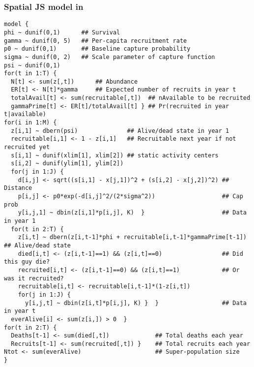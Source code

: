 \documentclass[color=usenames,dvipsnames]{beamer}\usepackage[]{graphicx}\usepackage[]{color}
\makeatletter
\newenvironment{kframe}{%
 \def\at@end@of@kframe{}%
 \ifinner\ifhmode%
  \def\at@end@of@kframe{\end{minipage}}%
  \begin{minipage}{\columnwidth}%
 \fi\fi%
 \def\FrameCommand##1{\hskip\@totalleftmargin \hskip-\fboxsep
 \colorbox{shadecolor}{##1}\hskip-\fboxsep
     \hskip-\linewidth \hskip-\@totalleftmargin \hskip\columnwidth}%
 \MakeFramed {\advance\hsize-\width
   \@totalleftmargin\z@ \linewidth\hsize
   \@setminipage}}%
 {\par\unskip\endMakeFramed%
 \at@end@of@kframe}
\newenvironment{knitrout}{}{} %
\makeatother
\begin{document}
\begin{frame}[fragile]
  \frametitle{Spatial JS model in \jags}
  \tiny
\begin{knitrout}\tiny
{}\color{fgcolor}\begin{kframe}
\begin{verbatim}
model {
phi ~ dunif(0,1)      ## Survival
gamma ~ dunif(0, 5)   ## Per-capita recruitment rate
p0 ~ dunif(0,1)       ## Baseline capture probability
sigma ~ dunif(0, 2)   ## Scale parameter of capture function
psi ~ dunif(0,1)    
for(t in 1:T) {
  N[t] <- sum(z[,t])      ## Abundance
  ER[t] <- N[t]*gamma     ## Expected number of recruits in year t
  totalAvail[t] <- sum(recruitable[,t])  ## nAvailable to be recruited
  gammaPrime[t] <- ER[t]/totalAvail[t] } ## Pr(recruited in year t|available)
for(i in 1:M) {
  z[i,1] ~ dbern(psi)              ## Alive/dead state in year 1
  recruitable[i,1] <- 1 - z[i,1]   ## Recruitable next year if not recruited yet
  s[i,1] ~ dunif(xlim[1], xlim[2]) ## static activity centers
  s[i,2] ~ dunif(ylim[1], ylim[2])
  for(j in 1:J) {
    d[i,j] <- sqrt((s[i,1] - x[j,1])^2 + (s[i,2] - x[j,2])^2) ## Distance
    p[i,j] <- p0*exp(-d[i,j]^2/(2*sigma^2))                   ## Cap prob
    y[i,j,1] ~ dbin(z[i,1]*p[i,j], K)  }                      ## Data in year 1
  for(t in 2:T) {
    z[i,t] ~ dbern(z[i,t-1]*phi + recruitable[i,t-1]*gammaPrime[t-1]) ## Alive/dead state 
    died[i,t] <- (z[i,t-1]==1) && (z[i,t]==0)                 ## Did this guy die?
    recruited[i,t] <- (z[i,t-1]==0) && (z[i,t]==1)            ## Or was it recruited?
    recruitable[i,t] <- recruitable[i,t-1]*(1-z[i,t])
    for(j in 1:J) {
      y[i,j,t] ~ dbin(z[i,t]*p[i,j], K) }  }                  ## Data in year t
  everAlive[i] <- sum(z[i,]) > 0  }
for(t in 2:T) {
  Deaths[t-1] <- sum(died[,t])             ## Total deaths each year
  Recruits[t-1] <- sum(recruited[,t]) }    ## Total recruits each year
Ntot <- sum(everAlive)                     ## Super-population size
}
\end{verbatim}
\end{kframe}
\end{knitrout}
\end{frame}
\end{document}
